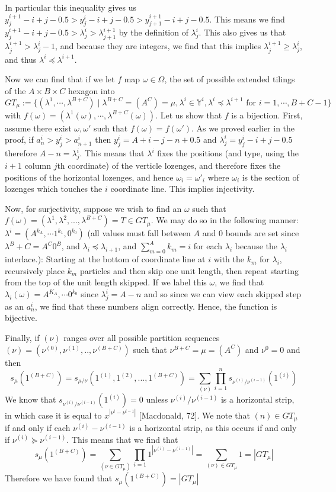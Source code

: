 \documentclass[12pt]{article}
\begin{document}
		In particular this inequality gives us $y_j^{i+1}-i+j-0.5>y_j^i-i+j-0.5>y^{i+1}_{j+1}-i+j-0.5$. 
		This means we find $y_j^{i+1}-i+j-0.5>\lambda_j^i>\lambda_{j+1}^{i+1}$ by the definition of $\lambda_j^i$.
		This also gives us that $\lambda_j^{i+1}>\lambda_j^i-1$, and because they are integers, we find that this implies $\lambda_j^{i+1}\geq\lambda_j^i$, and thus $\lambda^i\preceq \lambda^{i+1}$.
		
		Now we can find that if we let $f$ map $\omega\in \Omega$, the set of possible extended tilings of the $A\times B \times C$ hexagon into $$GT_\mu:=\{(\lambda^1,\cdots,\lambda^{B+C})\mid \lambda^{B+C}=(A^C)=\mu, \lambda^i\in \mathbb{Y}^i, \lambda^i\preceq \lambda^{i+1} \text{ for } i=1, \cdots , B+C-1\}$$ with $f(\omega)=(\lambda^1(\omega), \cdots, \lambda^{B+C}(\omega))$. 
		Let us show that $f$ is a bijection. First, assume there exist $\omega, \omega'$ such that $f(\omega)=f(\omega')$. 
		As we proved earlier in the proof, if $a_n^i>y_j^i>a_{n+1}^i$ then $y_j^i=A+i-j-n+0.5$ and $\lambda_j^i=y_j^i-i+j-0.5$ therefore $A-n=\lambda_j^i$. 
		This means that $\lambda^i$ fixes the positions (and type, using the $i+1$ column $j$th coordinate) of the verticle lozenges, and therefore fixes the positions of the horizontal lozenges, and hence $\omega_i=\omega'_i$ where $\omega_i$ is the section of lozenges which touches the $i$ coordinate line. 
		This implies injectivity. 
		
		Now, for surjectivity, suppose we wish to find an $\omega$ such that $f(\omega)=(\lambda^1, \lambda^2,...,\lambda^{B+C})=T\in GT_\mu$. 
		We may do so in the following manner: $\lambda^i=(A^{k_A}, \cdots 1^{k_1}, 0^{k_0} )$ (all values must fall between $A$ and $0$ bounds are set since $\lambda^B+C=A^C0^B$, and $\lambda_i\preceq \lambda_{i+1}$, and $\sum_{m=0}^A k_m=i$ for each $\lambda_i$ because the $\lambda_i$ interlace.): Starting at the bottom of coordinate line at $i$ with the $k_m$ for $\lambda_i$, recursively place $k_m$ particles and then skip one unit length, then repeat starting from the top of the unit length skipped. 
		If we label this $\omega$, we find that $\lambda_i(\omega)=A^{K_A},\cdots 0^{k_0}$ since $\lambda_j^i=A-n$ and so since we can view each skipped step as an $a_n^i$, we find that these numbers align correctly. Hence, the function is bijective.
		
		
		Finally, if $(\nu)$ ranges over all possible partition sequences $(\nu)=(\nu^{(0)},\nu^{(1)},..,\nu^{(B+C)})$ such that $\nu^{B+C}=\mu = (A^C)$ and $\nu^0=0$ and  then $$s_\mu(1^{(B+C)})=s_{\mu/\nu}(1^{(1)},1^{(2)},...,1^{(B+C)})=\sum_{(\nu)}\prod_{i=1}^n s_{\nu^{(i)}/\nu^{(i-1)}}(1^{(i)})$$
		We know that $s_{\nu^{(i)}/\nu^{(i-1)}}(1^{(i)})=0$ unless $\nu^{(i)}/\nu^{(i-1)}$ is a horizontal strip, in which case it is equal to $x^{|\nu^{i}-\nu^{i-1}|}$ [Macdonald, 72]. 
		We note that $(n)\in GT_\mu$ if and only if each $\nu^{(i)}-\nu^{(i-1)}$ is a horizontal strip, as this occurs if and only if $\nu^{(i)}\succeq \nu^{(i-1)}$. 
		This means that we find that $$s_\mu(1^{(B+C)})=\sum_{(\nu\in GT_\mu)}\prod_{i=1} 1^{|\nu^{(i)}-\nu^{(i-1)}|}=\sum_{(\nu)\in GT_\mu} 1=|GT_\mu|$$ Therefore we have found that $s_\mu(1^{(B+C)})=|GT_\mu|$
		
\end{document}
